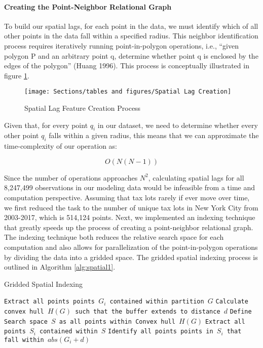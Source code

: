 \documentclass[12pt,]{article}
\let\oldparagraph\paragraph
\renewcommand{\paragraph}[1]{\oldparagraph{#1}\mbox{}}
\begin{document}
\hypertarget{creating-the-point-neighbor-relational-graph}{%
\paragraph{Creating the Point-Neighbor Relational
Graph}\label{creating-the-point-neighbor-relational-graph}}

To build our spatial lags, for each point in the data, we must identify
which of all other points in the data fall within a specified radius.
This neighbor identification process requires iteratively running
point-in-polygon operations, i.e., ``given polygon P and an arbitrary
point q, determine whether point q is enclosed by the edges of the
polygon'' (Huang 1996). This process is conceptually illustrated in
figure \ref{fig:Spatial Lag Feataure Process}.

\begin{figure}[H]
\texttt{[image: Sections/tables and figures/Spatial Lag Creation]} \caption{Spatial Lag Feature Creation Process}\label{fig:Spatial Lag Feataure Process}
\end{figure}

Given that, for every point \(q_i\) in our dataset, we need to determine
whether every other point \(q_i\) falls within a given radius, this
means that we can approximate the time-complexity of our operation as:

\[
O(N(N-1))
\]

Since the number of operations approaches \(N^2\), calculating spatial
lags for all 8,247,499 observations in our modeling data would be
infeasible from a time and computation perspective. Assuming that tax
lots rarely if ever move over time, we first reduced the task to the
number of unique tax lots in New York City from 2003-2017, which is
514,124 points. Next, we implemented an indexing technique that greatly
speeds up the process of creating a point-neighbor relational graph. The
indexing technique both reduces the relative search space for each
computation and also allows for parallelization of the point-in-polygon
operations by dividing the data into a gridded space. The gridded
spatial indexing process is outlined in Algorithm \ref{alg:spatial1}.

\begin{algorithm}
  \caption{Gridded Spatial Indexing}
  \label{alg:spatial1}
  \begin{algorithmic}[1]
        \State \texttt{Extract all points points $G_i$ contained within partition $G$}
        \State \texttt{Calculate convex hull $H(G)$ such that the buffer extends to distance $d$}
        \State \texttt{Define Search space $S$ as all points within Convex hull $H(G)$}
        \State \texttt{Extract all points $S_i$ contained within $S$}
            \State \texttt{Identify all points points in $S_i$ that fall within $abs(G_i+d)$}
        \EndFor
      \EndFor
  \end{algorithmic}
\end{algorithm}
\end{document}
